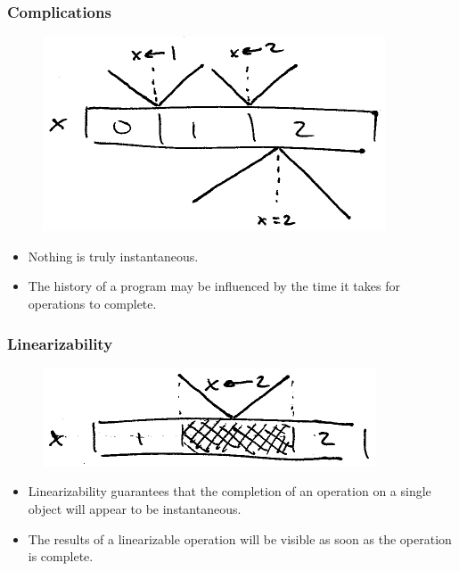 \documentclass{beamer}
\begin{document}
  \begin{frame}
    \frametitle{Complications}

    \begin{figure}
      \centering
      \includegraphics{noninstantaneity}
    \end{figure}

    \begin{itemize}
      \item Nothing is truly instantaneous.
      \item The history of a program may be influenced by the time it takes for operations to complete.
    \end{itemize}
  \end{frame}

  \begin{frame}
    \frametitle{Linearizability}

    \begin{figure}
      \centering
      \includegraphics{linearizability}
    \end{figure}

    \begin{itemize}
      \item Linearizability guarantees that the completion of an operation on a single object will appear to be instantaneous.
      \item The results of a linearizable operation will be visible as soon as the operation is complete.
    \end{itemize}
  \end{frame}
\end{document}
